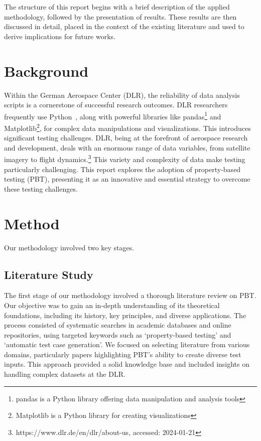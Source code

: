 \documentclass[runningheads]{llncs}
\begin{document}
The structure of this report begins with a brief description of the applied methodology, followed by the presentation of results. These results are then discussed in detail, placed in the context of the existing literature and used to derive implications for future works.

\section{Background}
Within the German Aerospace Center (DLR), the reliability of data analysis scripts is a cornerstone of successful research outcomes. DLR researchers frequently use Python~\cite{Kurnatowski2020}, along with powerful libraries like pandas\footnote{pandas is a Python library offering data manipulation and analysis tools} and Matplotlib\footnote{Matplotlib is a Python library for creating visualizations}, for complex data manipulations and visualizations. This introduces significant testing challenges. DLR, being at the forefront of aerospace research and development, deals with an enormous range of data variables, from satellite imagery to flight dynamics.\footnote{https://www.dlr.de/en/dlr/about-us, accessed: 2024-01-21} This variety and complexity of data make testing particularly challenging. This report explores the adoption of property-based testing (PBT), presenting it as an innovative and essential strategy to overcome these testing challenges.

\section{Method}
Our methodology involved two key stages.

\subsection{Literature Study}
The first stage of our methodology involved a thorough literature review on PBT. Our objective was to gain an in-depth understanding of its theoretical foundations, including its history, key principles, and diverse applications. The process consisted of systematic searches in academic databases and online repositories, using targeted keywords such as `property-based testing' and `automatic test case generation'. We focused on selecting literature from various domains, particularly papers highlighting PBT's ability to create diverse test inputs. This approach provided a solid knowledge base and included insights on handling complex datasets at the DLR.
\end{document}
